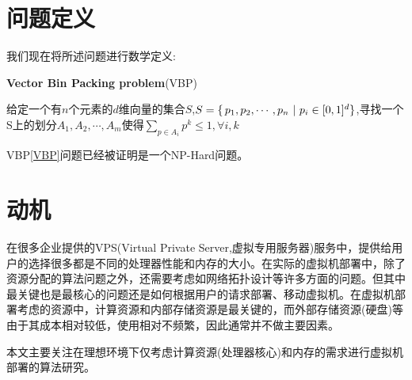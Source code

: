 \section{问题定义}
\label{sec:prob-definition}

我们现在将所述问题进行数学定义:
\begin{defn}
\textbf{Vector Bin Packing problem}(VBP)


\label{VBP}

{\kai 给定一个有$n$个元素的$d$维向量的集合$S$,$S = \{\thinspace p_1,p_2,\cdots,p_n\ |\ p_i \in [0,1]^d \}$,寻找一个S上的划分$A_1,A_2,\cdots,A_m$使得$\sum_{p \in A_i}p^k\leq 1,\forall i,k$}
\end{defn}

VBP\ref{VBP}问题已经被证明是一个NP-Hard问题\cite{Garey76}。


\section{动机}
\label{sec:concern}


在很多企业提供的VPS(Virtual Private Server,虚拟专用服务器)服务中，提供给用户的选择很多都是不同的处理器性能和内存的大小。在实际的虚拟机部署中，除了资源分配的算法问题之外，还需要考虑如网络拓扑设计等许多方面的问题。但其中最关键也是最核心的问题还是如何根据用户的请求部署、移动虚拟机。在虚拟机部署考虑的资源中，计算资源和内部存储资源是最关键的，而外部存储资源(硬盘)等由于其成本相对较低，使用相对不频繁，因此通常并不做主要因素。

本文主要关注在理想环境下仅考虑计算资源(处理器核心)和内存的需求进行虚拟机部署的算法研究。



 






